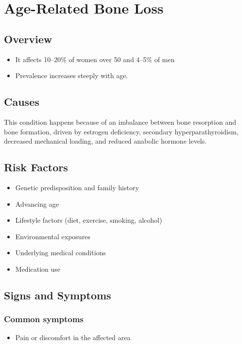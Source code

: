 \chapter{Age-Related Bone Loss}
\label{sec:Age-Related Bone Loss}

\section{Overview}


\begin{itemize}[noitemsep]
  \item It affects 10--20\% of women over 50 and 4--5\% of men
  \item Prevalence increases steeply with age.
\end{itemize}
\section{Causes}
This condition happens because of an imbalance between bone resorption and bone formation, driven by estrogen deficiency, secondary hyperparathyroidism, decreased mechanical loading, and reduced anabolic hormone levels.     
\section{Risk Factors}

\begin{itemize}[noitemsep]
  \item Genetic predisposition and family history
  \item Advancing age
  \item Lifestyle factors (diet, exercise, smoking, alcohol)
  \item Environmental exposures
  \item Underlying medical conditions
  \item Medication use
\end{itemize}
\section{Signs and Symptoms}

\subsection{Common symptoms}
\begin{itemize}[noitemsep]
  \item Pain or discomfort in the affected area
  \end{itemize}

